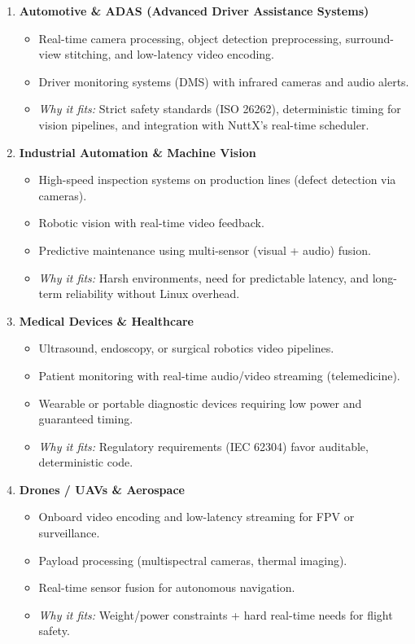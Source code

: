 \documentclass{article}
\begin{document}
\begin{enumerate}
\item \textbf{Automotive \& ADAS (Advanced Driver Assistance Systems)}
    \begin{itemize}
        \item Real-time camera processing, object detection preprocessing, surround-view stitching, and low-latency video encoding.
        \item Driver monitoring systems (DMS) with infrared cameras and audio alerts.
        \item \textit{Why it fits:} Strict safety standards (ISO 26262), deterministic timing for vision pipelines, and integration with NuttX’s real-time scheduler.
    \end{itemize}

\item \textbf{Industrial Automation \& Machine Vision}
    \begin{itemize}
        \item High-speed inspection systems on production lines (defect detection via cameras).
        \item Robotic vision with real-time video feedback.
        \item Predictive maintenance using multi-sensor (visual + audio) fusion.
        \item \textit{Why it fits:} Harsh environments, need for predictable latency, and long-term reliability without Linux overhead.
    \end{itemize}

\item \textbf{Medical Devices \& Healthcare}
    \begin{itemize}
        \item Ultrasound, endoscopy, or surgical robotics video pipelines.
        \item Patient monitoring with real-time audio/video streaming (telemedicine).
        \item Wearable or portable diagnostic devices requiring low power and guaranteed timing.
        \item \textit{Why it fits:} Regulatory requirements (IEC 62304) favor auditable, deterministic code.
    \end{itemize}

\item \textbf{Drones / UAVs \& Aerospace}
    \begin{itemize}
        \item Onboard video encoding and low-latency streaming for FPV or surveillance.
        \item Payload processing (multispectral cameras, thermal imaging).
        \item Real-time sensor fusion for autonomous navigation.
        \item \textit{Why it fits:} Weight/power constraints + hard real-time needs for flight safety.
    \end{itemize}


\end{enumerate}
\end{document}
